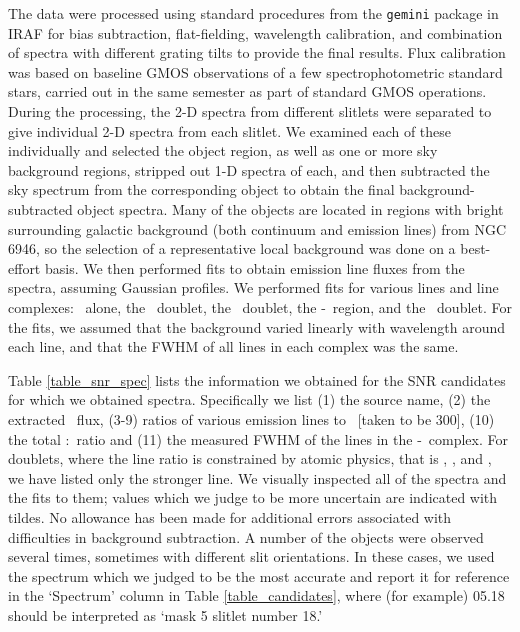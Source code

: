 
The data were processed using standard procedures  from the {\tt gemini} package in IRAF  for bias subtraction, flat-fielding, wavelength calibration, and combination of spectra with different grating tilts to provide the final results.  
Flux calibration was based on baseline GMOS observations of a few spectrophotometric standard stars, carried out in the same semester as part of standard GMOS operations.  
During the processing, the 2-D spectra from different slitlets were separated to give individual 2-D spectra from each slitlet.   We examined each of these individually and selected the object region, as well as one or more sky background regions,  stripped out 1-D spectra of each, and then subtracted the sky spectrum from the corresponding object to obtain the final background-subtracted object spectra.
Many of the objects are located in regions with bright surrounding galactic background (both continuum and emission lines) from NGC\,6946, so the selection of a representative local background was done on a best-effort basis.  
We then performed  fits to obtain emission line fluxes  from the spectra, assuming Gaussian profiles.  We performed fits for various lines and line complexes:  \hb\ alone,  the \oiii\ doublet,  the \oi\ doublet,  the \ha-\nii\ region, and   the \sii\ doublet. For the fits, we assumed that the background varied linearly with wavelength around each line, and that the FWHM of all lines in each complex was the same.


Table \ref{table_snr_spec}  lists the information we obtained for the SNR candidates for which we obtained spectra.  Specifically we list (1) the source name, (2) the extracted  \ha\ flux, (3-9) ratios of various emission lines to \ha\ [taken to be 300], (10) the total \sii:\ha\ ratio and (11) the measured FWHM of the lines in the \ha-\nii\ complex.  For doublets, where the line ratio is constrained by atomic physics, that is \oiii, \oi, and \nii, we have listed only the stronger line.  We visually inspected all of the spectra and the fits to them; values which we judge to be more uncertain are indicated with tildes.  No allowance has been made for additional errors associated with difficulties in background subtraction.  A number of the objects were observed several times, sometimes with different slit orientations.  In these cases, we used the spectrum which we judged to be the most accurate and report it for reference in the `Spectrum' column in Table \ref{table_candidates}, where (for example) 05.18 should be interpreted as `mask 5 slitlet number 18.'


